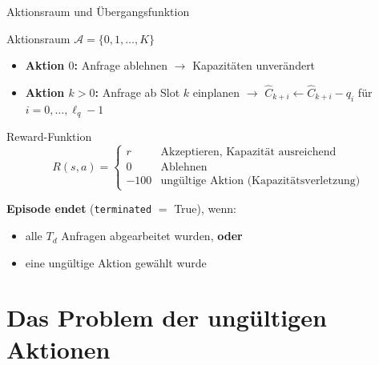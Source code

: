 \documentclass[aspectratio=169]{beamer}
\begin{document}
\begin{frame}{Aktionsraum und Übergangsfunktion}

  \begin{block}{Aktionsraum $\mathcal{A} = \{0, 1, \ldots, K\}$}
    \begin{itemize}
      \item \textbf{Aktion $0$:} Anfrage ablehnen $\rightarrow$ Kapazitäten unverändert
      \item \textbf{Aktion $k > 0$:} Anfrage ab Slot $k$ einplanen
            $\rightarrow$ $\hat{C}_{k+i} \leftarrow \hat{C}_{k+i} - q_i$ für $i = 0, \ldots, \ell_q - 1$
    \end{itemize}
  \end{block}

  \bigskip
  \begin{block}{Reward-Funktion}
    \[
      R(s, a) =
      \begin{cases}
        r    & \text{Akzeptieren, Kapazität ausreichend} \\
        0    & \text{Ablehnen} \\
        -100 & \text{ungültige Aktion (Kapazitätsverletzung)}
      \end{cases}
    \]
  \end{block}

  \bigskip
  \textbf{Episode endet} (\texttt{terminated} $=$ True), wenn:
  \begin{itemize}
    \item alle $T_d$ Anfragen abgearbeitet wurden, \textbf{oder}
    \item eine ungültige Aktion gewählt wurde
  \end{itemize}

\end{frame}

\section{Das Problem der ungültigen Aktionen}
\end{document}
